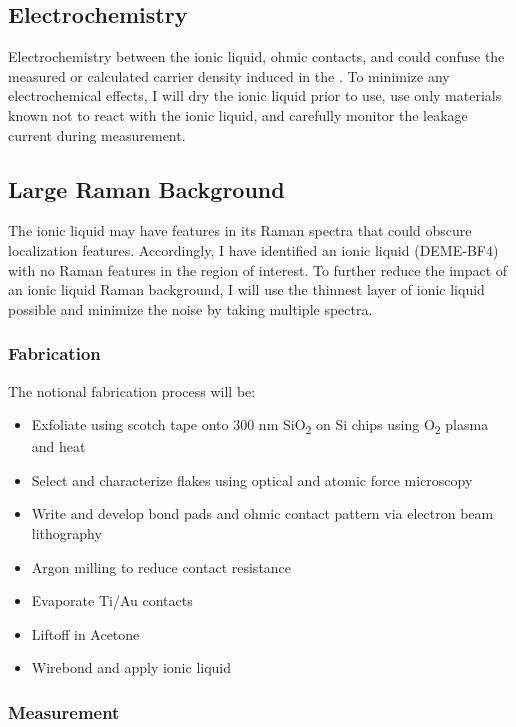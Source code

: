 \documentclass[11pt]{article}
\begin{document}
\subsection{Electrochemistry}
Electrochemistry between the ionic liquid, ohmic contacts, and \rucl could confuse the measured or calculated carrier density induced in the \ruclnospace. To minimize any electrochemical effects, I will dry the ionic liquid prior to use, use only materials known not to react with the ionic liquid, and carefully monitor the leakage current during measurement.

\subsection{Large Raman Background}
The ionic liquid may have features in its Raman spectra that could obscure localization features. Accordingly, I have identified an ionic liquid (DEME-BF4) with no Raman features in the region of interest. To further reduce the impact of an ionic liquid Raman background, I will use the thinnest layer of ionic liquid possible and minimize the noise by taking multiple spectra.

\subsubsection{Fabrication}

The notional fabrication process will be:

\begin{itemize}
	\item Exfoliate \rucl using scotch tape onto 300 nm SiO\textsubscript{2} on Si chips using O\textsubscript{2} plasma and heat
	\item Select and characterize flakes using optical and atomic force microscopy
	\item Write and develop bond pads and ohmic contact pattern via electron beam lithography
	\item Argon milling to reduce contact resistance
	\item Evaporate Ti/Au contacts
	\item Liftoff in Acetone
	\item Wirebond and apply ionic liquid
\end{itemize}

\subsubsection{Measurement}
\end{document}
